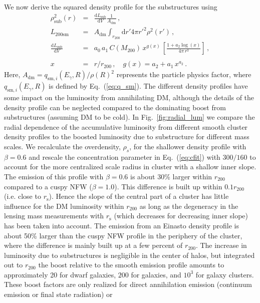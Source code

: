 \documentclass[10pt,aps,pra,reprint,amsmath,amsfonts,amssymb,showpacs,nofootinbib,floatfix]{revtex4-1}
\newcommand{\rmn}{\mathrm}
\newcommand{\s}{\rmn{s}}
\newcommand{\sm}{\rmn{sm}}
\newcommand{\dd}{\rmn{d}}
\newcommand{\rhos}{\ensuremath{\rho_s}}
\newcommand{\rvir}{r_{200}}
\newcommand{\mvir}{M_{200}}
\newcommand{\eg}{E_\gamma}
\begin{document}
We now derive the squared density profile for the substructures
using
\begin{eqnarray}
\rho_\rmn{sub}^2(r) &=& \frac{\dd L_\rmn{sub}}{\dd V} \frac{1}{A_{\rmn{dm}}}\,,\label{eq:rho_sub}\\
L_{200\sm} &=&  A_{\rmn{dm}} \int_{\rvir} \dd r' 4\pi r'^2 \rho^2(r')\,,\label{eq:Lsm}\\
 \frac{\dd L_\rmn{sub}}{\dd V} &=& a_0\,a_1\,C(\mvir)\,x^{g(x)}\,
\left[\frac{1+a_2\log(x)}{4\pi\,r^3}\right]\,,\nonumber\\
\\
x &=& r/\rvir\,,\quad g(x) = a_2+a_1\,x^{a_2}\,.\label{eq:xvir}
\end{eqnarray} 
Here, $A_{\rmn{dm}} = q_{\rmn{sm},i}(\eg,R) / \rho(R)^2$ represents
the particle physics factor, where $q_{\rmn{sm},i}(\eg,R)$ is defined by
Eq.~(\ref{eq:q_sm}). The different density profiles have some impact
on the luminosity from annihilating DM, although the details of the
density profile can be neglected compared to the dominating boost from
substructures (assuming DM to be cold). In Fig.~\ref{fig:radial_lum}
we compare the radial dependence of the accumulative luminosity from
different smooth cluster density profiles to the boosted luminosity
due to substructure for different mass scales. We recalculate the
overdensity, $\rhos$, for the shallower density profile with
$\beta=0.6$ and rescale the concentration parameter in
Eq.~(\ref{eq:cfit}) with $300/160$ \cite{2011ApJ...728L..39N} to
account for the more centralized scale radius in cluster with a
shallow inner slope. The emission of this profile with $\beta=0.6$ is
about 30\% larger within $\rvir$ compared to a cuspy NFW
($\beta=1.0$).  This difference is built up within $0.1\rvir$
(i.e. close to $r_\s$). Hence the slope of the central part of a
cluster has little influence for the DM luminosity within $\rvir$ as
long as the degeneracy in the lensing mass measurements with $r_\s$
(which decreases for decreasing inner slope) has been taken into
account. The emission from an Einasto density profile is about 50\%
larger than the cuspy NFW profile in the periphery of the cluster,
where the difference is mainly built up at a few percent of
$\rvir$. The increase in luminosity due to substructures is negligible
in the center of halos, but integrated out to $\rvir$ the boost
relative to the smooth emission profile amounts to approximately 20
for dwarf galaxies, $200$ for galaxies, and $10^3$ for galaxy
clusters. These boost factors are only realized for direct
annihilation emission (continuum emission or final state radiation) or
\end{document}
